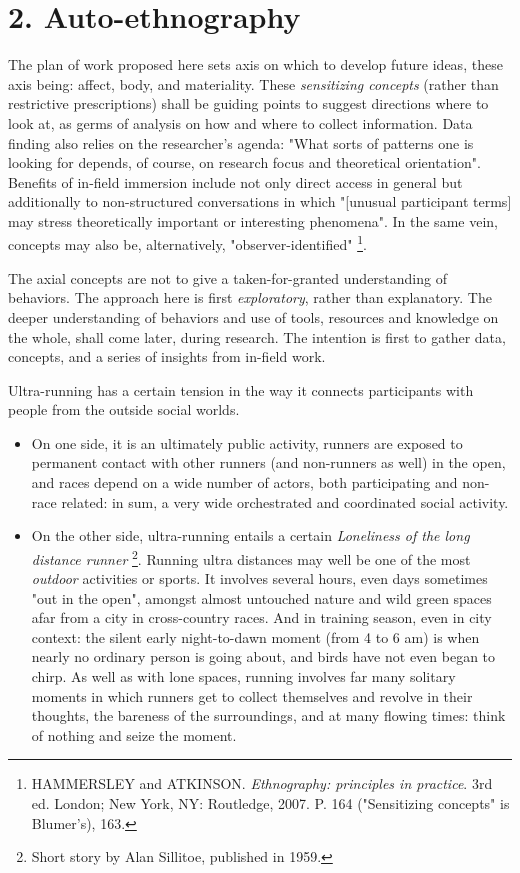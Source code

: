 \clearpage
\section*{2. Auto-ethnography}

The plan of work proposed here sets axis on which to develop future ideas, these axis being: 
affect,
body, 
and materiality.
These \textit{sensitizing concepts} (rather than restrictive prescriptions) shall be guiding points to suggest directions where to look at, as germs of analysis on how and where to collect information. Data finding also relies on the researcher's agenda: "What sorts of patterns one is looking for depends, of course, on research focus and theoretical orientation". Benefits of in-field immersion include not only direct access in general but additionally to non-structured conversations in which "[unusual participant terms] may stress theoretically important or interesting phenomena". In the same vein, concepts may also be, alternatively, "observer-identified"%
\footnote{HAMMERSLEY and ATKINSON. \textit{Ethnography: principles in practice}. 3rd ed. London; New York, NY: Routledge, 2007. P. 164 ("Sensitizing concepts" is Blumer's), 163.}.

The axial concepts are not %
to give a taken-for-granted understanding of behaviors. The approach here is first \textit{exploratory}, rather  than explanatory. The deeper understanding of behaviors and use of tools, resources and knowledge %
on the whole, %
shall come later, during research. The intention is first to gather data, concepts, and a series of insights from in-field work.

Ultra-running has a certain tension in the way it connects participants with people from the outside social worlds.

\begin{itemize}
 \item On one side, it is an ultimately public activity, runners are exposed to permanent contact with other runners (and non-runners as well) in the open, and races depend on a wide number  of actors, both participating and non-race related: in sum, a very wide orchestrated and coordinated social activity.
 \item On the other side, ultra-running entails a certain \textit{Loneliness of the long distance runner}%
 \footnote{Short story by Alan Sillitoe, published in 1959.}. 
 Running ultra distances may well be one of  the most \textit{outdoor} activities or sports. It involves several hours, even days sometimes "out in the  open", amongst  almost untouched nature and wild green spaces afar from a city in cross-country races. And in training season, even in city context: the silent early night-to-dawn moment (from 4 to 6 am) is when nearly no ordinary person is going about, and birds have not even began to chirp. As well as with lone spaces, running involves far many solitary moments in which runners get to collect themselves and revolve in their thoughts, the bareness of the surroundings, and at many flowing times:  
 think of nothing and seize the moment.  
\end{itemize}

